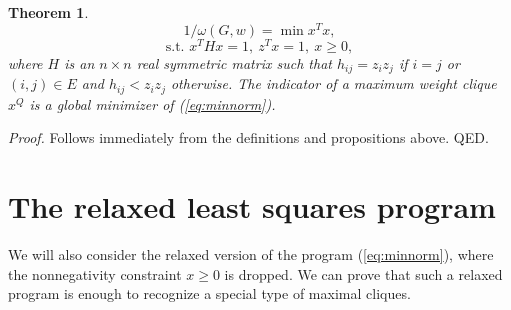 \documentclass[11pt]{article}
\newtheorem{thm}{Theorem}
\begin{document}
\begin{thm}
\label{thm:minnorm}
\begin{equation}
\label{eq:minnorm}
1/\omega(G,w) = \min x^T x,
\end{equation}
\[ \mbox{s.t. } x^T H x = 1, \ z^T x = 1, \ x \geq 0, \]
where $H$ is an $n \times n$ real symmetric matrix such that
$h_{ij} = z_i z_j$ if $i=j$ or $(i,j) \in E$ and $h_{ij} < z_i z_j$ otherwise.
The indicator of a maximum weight clique $x^Q$ is a global minimizer of
(\ref{eq:minnorm}).
\end{thm}
{\em Proof.} Follows immediately from the definitions and propositions above.
QED.

\section{The relaxed least squares program}

We will also consider the relaxed version of the program (\ref{eq:minnorm}),
where the nonnegativity constraint $x \geq 0$ is dropped. We can prove that
such a relaxed program is enough to recognize a special type of maximal
cliques.
\end{document}
